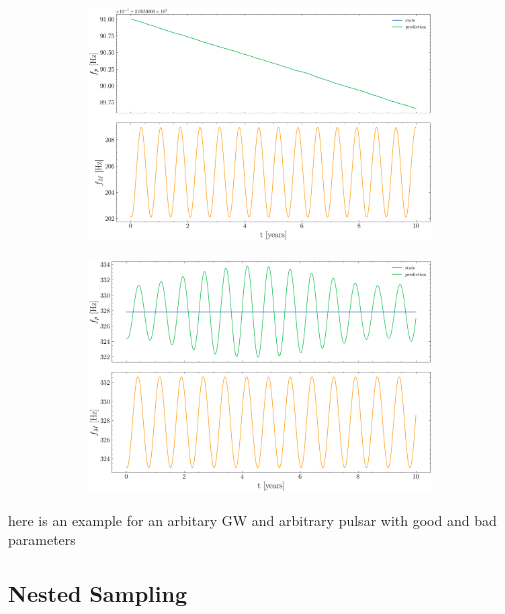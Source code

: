 \documentclass[fleqn,usenatbib,useAMS]{mnras}
\begin{document}
\begin{figure}
	\begin{subfigure}[b]{1\columnwidth}
		\includegraphics[width=\textwidth]{images/KF1}
		\caption{}
		\label{fig:6MB_BFS}
	\end{subfigure}
	\hfill
	\begin{subfigure}[b]{1\columnwidth}
		\includegraphics[width=\textwidth]{images/KF2}
		\caption{}
		\label{fig:25MB_bfs}
	\end{subfigure}
	\label{fig:four figures}
\end{figure}





here is an example for an arbitary GW and arbitrary pulsar with good and bad parameters 
\subsection{Nested Sampling}
\end{document}
